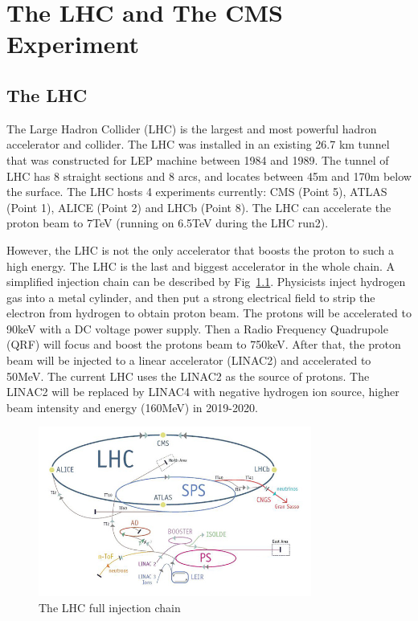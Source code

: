 \chapter{The LHC and The CMS Experiment}

\clearpage
\section{The LHC}

The Large Hadron Collider (LHC) is the largest and most powerful hadron accelerator and collider. The LHC was installed in an existing 26.7 km tunnel that was constructed for LEP machine between 1984 and 1989. The tunnel of LHC has 8 straight sections and 8 arcs, and locates between 45m and 170m below the surface. The LHC hosts 4 experiments currently: CMS (Point 5), ATLAS (Point 1), ALICE (Point 2) and LHCb (Point 8). The LHC can accelerate the proton beam to 7TeV (running on 6.5TeV during the LHC run2).

However, the LHC is not the only accelerator that boosts the proton to such a high energy. The LHC is the last and biggest accelerator in the whole chain. A simplified injection chain can be described by Fig~\ref{fig:c3lhclpsspslhc}. Physicists inject hydrogen gas into a metal cylinder, and then put a strong electrical field to strip the electron from hydrogen to obtain proton beam. The protons will be accelerated to 90keV with a DC voltage power supply. Then a Radio Frequency Quadrupole (QRF) will focus and boost the protons beam to 750keV. After that, the proton beam will be injected to a linear accelerator (LINAC2) and accelerated to 50MeV. The current LHC uses the LINAC2 as the source of protons. The LINAC2 will be replaced by LINAC4 with negative hydrogen ion source, higher beam intensity and energy (160MeV) in 2019-2020. 

\begin{figure}[htbp]
 \begin{center}
  \includegraphics[width=0.8\textwidth]{figures/c3/c3_lhc_lpsspslhc.jpg}
 \end{center}
 \caption{The LHC full injection chain}
 \label{fig:c3lhclpsspslhc}
\end{figure}

